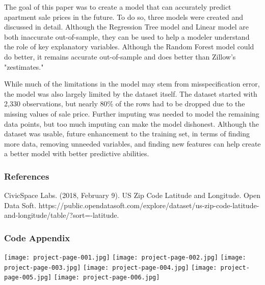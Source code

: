 \documentclass[12pt]{article}
\begin{document}
The goal of this paper was to create a model that can accurately predict apartment sale prices in the future. To do so, three models were created and discussed in detail. Although the Regression Tree model and Linear model are both inaccurate out-of-sample, they can be used to help a modeler understand the role of key explanatory variables. Although the Random Forest model could do better, it remains accurate out-of-sample and does better than Zillow's "zestimates."

While much of the limitations in the model may stem from misspecification error, the model was also largely limited by the dataset itself. The dataset started with 2,330 observations, but nearly 80\% of the rows had to be dropped due to the missing values of sale price. Further imputing was needed to model the remaining data points, but too much imputing can make the model dishonest. Although the dataset was usable, future enhancement to the training set, in terms of finding more data, removing unneeded variables, and finding new features can help create a better model with better predictive abilities.

\subsubsection*{References}

CivicSpace Labs. (2018, February 9). US Zip Code Latitude and Longitude. Open Data Soft. https://public.opendatasoft.com/explore/dataset/us-zip-code-latitude-and-longitude/table/?sort=-latitude.

\pagebreak

\subsubsection*{Code Appendix}

\texttt{[image: project-page-001.jpg]} \pagebreak
\texttt{[image: project-page-002.jpg]} \pagebreak
\texttt{[image: project-page-003.jpg]} \pagebreak
\texttt{[image: project-page-004.jpg]} \pagebreak
\texttt{[image: project-page-005.jpg]} \pagebreak
\texttt{[image: project-page-006.jpg]} \\
\end{document}
